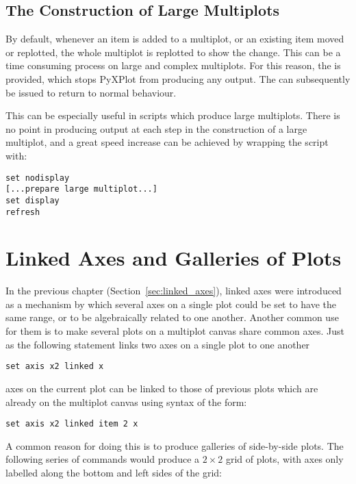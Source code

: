 \subsection{The Construction of Large Multiplots}
\label{sec:set_display}

By default, whenever an item is added to a multiplot, or an existing item moved
or replotted, the whole multiplot is replotted to show the change. This can be
a time consuming process on large and complex multiplots. For this reason, the
 is provided, which stops PyXPlot from producing any
output. The  can subsequently be issued to return to
normal behaviour.

This can be especially useful in scripts which produce large multiplots. There
is no point in producing output at each step in the construction of a large
multiplot, and a great speed increase can be achieved by wrapping the script
with:

\begin{verbatim}
set nodisplay
[...prepare large multiplot...]
set display
refresh
\end{verbatim}

\section{Linked Axes and Galleries of Plots}

In the previous chapter (Section~\ref{sec:linked_axes}), linked axes were
introduced as a mechanism by which several axes on a single plot could be set
to have the same range, or to be algebraically related to one another. Another
common use for them is to make several plots on a multiplot canvas share common
axes. Just as the following statement links two axes on a single plot to one
another
\begin{verbatim}
set axis x2 linked x
\end{verbatim}
axes on the current plot can be linked to those of previous plots which are
already on the multiplot canvas using syntax of the form:
\begin{verbatim}
set axis x2 linked item 2 x
\end{verbatim}

A common reason for doing this is to produce galleries of side-by-side plots.
The following series of commands would produce a $2\times2$ grid of plots, with
axes only labelled along the bottom and left sides of the grid:

